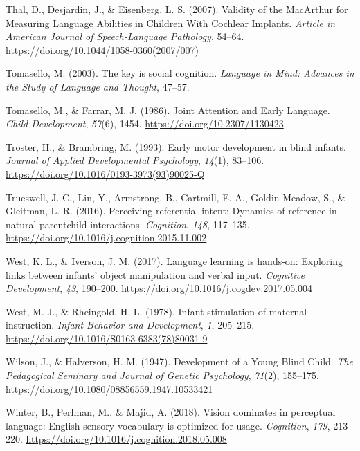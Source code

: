 \documentclass[
  man,floatsintext]{apa6}
\newlength{\cslhangindent}
\newlength{\cslentryspacingunit} %
\newenvironment{CSLReferences}[2] %
 {%
  \setlength{\parindent}{0pt}
  \ifodd #1
  \let\oldpar\par
  \def\par{\hangindent=\cslhangindent\oldpar}
  \fi
  \setlength{\parskip}{#2\cslentryspacingunit}
 }%
 {}
\begin{document}
\begin{CSLReferences}{1}{0}
\leavevmode{}%
Thal, D., Desjardin, J., \& Eisenberg, L. S. (2007). Validity of the {MacArthur} for {Measuring Language Abilities} in {Children With Cochlear Implants}. \emph{Article in American Journal of Speech-Language Pathology}, 54--64. \url{https://doi.org/10.1044/1058-0360(2007/007)}

\leavevmode{}%
Tomasello, M. (2003). The key is social cognition. \emph{Language in Mind: Advances in the Study of Language and Thought}, 47--57.

\leavevmode{}%
Tomasello, M., \& Farrar, M. J. (1986). Joint {Attention} and {Early Language}. \emph{Child Development}, \emph{57}(6), 1454. \url{https://doi.org/10.2307/1130423}

\leavevmode{}%
Tröster, H., \& Brambring, M. (1993). Early motor development in blind infants. \emph{Journal of Applied Developmental Psychology}, \emph{14}(1), 83--106. \url{https://doi.org/10.1016/0193-3973(93)90025-Q}

\leavevmode{}%
Trueswell, J. C., Lin, Y., Armstrong, B., Cartmill, E. A., Goldin-Meadow, S., \& Gleitman, L. R. (2016). Perceiving referential intent: {Dynamics} of reference in natural parent\textendash child interactions. \emph{Cognition}, \emph{148}, 117--135. \url{https://doi.org/10.1016/j.cognition.2015.11.002}

\leavevmode{}%
West, K. L., \& Iverson, J. M. (2017). Language learning is hands-on: {Exploring} links between infants' object manipulation and verbal input. \emph{Cognitive Development}, \emph{43}, 190--200. \url{https://doi.org/10.1016/j.cogdev.2017.05.004}

\leavevmode{}%
West, M. J., \& Rheingold, H. L. (1978). Infant stimulation of maternal instruction. \emph{Infant Behavior and Development}, \emph{1}, 205--215. \url{https://doi.org/10.1016/S0163-6383(78)80031-9}

\leavevmode{}%
Wilson, J., \& Halverson, H. M. (1947). Development of a {Young Blind Child}. \emph{The Pedagogical Seminary and Journal of Genetic Psychology}, \emph{71}(2), 155--175. \url{https://doi.org/10.1080/08856559.1947.10533421}

\leavevmode{}%
Winter, B., Perlman, M., \& Majid, A. (2018). Vision dominates in perceptual language: {English} sensory vocabulary is optimized for usage. \emph{Cognition}, \emph{179}, 213--220. \url{https://doi.org/10.1016/j.cognition.2018.05.008}


\end{CSLReferences}
\end{document}
